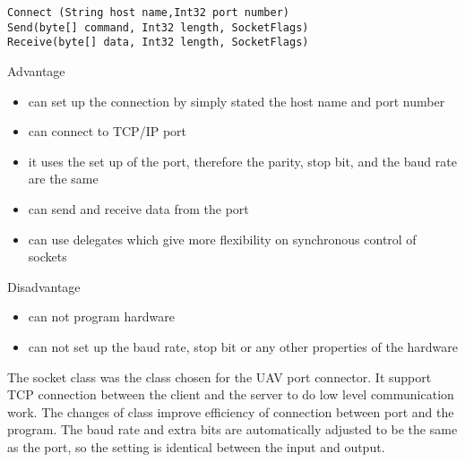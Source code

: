 \begin{lstlisting}[caption=Socket class connect receive and send method,label=socketClasscrs]
Connect (String host name,Int32 port number)
Send(byte[] command, Int32 length, SocketFlags)
Receive(byte[] data, Int32 length, SocketFlags)
\end{lstlisting}

Advantage
\begin{itemize}
\item can set up the connection by simply stated the host name and port number
\item can connect to TCP/IP port 
\item it uses the set up of the port, therefore the parity, stop bit, and the baud rate are the same
\item can send and receive data from the port
\item can use delegates which give more flexibility on synchronous control of sockets \cite{robertH}
\end{itemize}
Disadvantage
\begin{itemize}
\item can not program hardware
\item can not set up the baud rate, stop bit or any other properties of the hardware
\end{itemize}

The socket class was the class chosen for the UAV port connector. 
It support TCP connection between the client and the server to do low level communication work\cite{xiaX}. 
The changes of class improve efficiency of connection between port and the program. 
The baud rate and extra bits are automatically adjusted to be the same as the port, so the setting is identical between the input and output.